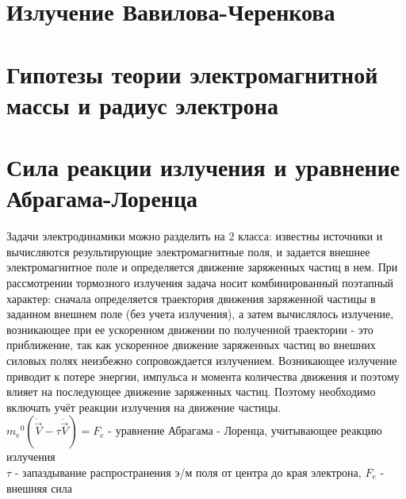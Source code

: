 \begin{multicols*}{2}
		\section{Излучение Вавилова-Черенкова}
		
		\section{Гипотезы теории электромагнитной массы и радиус электрона}
		
		\section{Сила реакции излучения и уравнение Абрагама-Лоренца}
		Задачи электродинамики можно разделить на 2 класса: известны источники и вычисляются результирующие электромагнитные поля, и задается внешнее электромагнитное поле и определяется движение заряженных частиц в нем. При рассмотрении тормозного излучения задача носит комбинированный поэтапный характер: сначала определяется траектория движения заряженной частицы в заданном внешнем поле (без учета излучения), а затем вычислялось излучение, возникающее при ее ускоренном движении по полученной траектории - это приближение, так как ускоренное движение заряженных частиц во внешних силовых полях неизбежно сопровождается излучением. Возникающее излучение приводит к потере энергии, импульса и момента количества движения и поэтому влияет на последующее движение заряженных частиц. Поэтому необходимо включать учёт реакции излучения на движение частицы. \\
		${m_e}^0(\dot{\vec{V}} - \tau \ddot{\vec{V}}) = F_e$ - уравнение Абрагама - Лоренца, учитывающее реакцию излучения\\
		$\tau$ - запаздывание распространения э/м поля от центра до края электрона, \quad $F_e$ - внешняя сила

		
	\end{multicols*}

